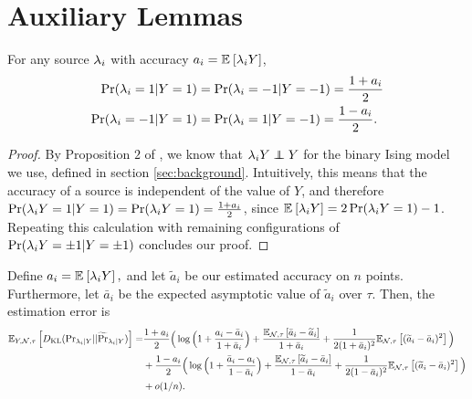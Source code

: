 \section{Auxiliary Lemmas}

\begin{lemma}
For any source $\lambda_i$ with accuracy $a_i = \mathbb{E}_{}\left[\lambda_i Y\right]$,
\begin{align*}
\Pr(\lambda_i = 1 | Y = 1) &= \Pr(\lambda_i = -1 | Y = -1) = \frac{1 + a_i}{2}  \\
\Pr(\lambda_i = -1 | Y = 1) &= \Pr(\lambda_i = 1 | Y = -1) = \frac{1 - a_i}{2}.
\end{align*}
\label{lemma:fs_symmetry}
\end{lemma}
\begin{proof}
By Proposition $2$ of \cite{fu2020fast}, we know that $\lf_i Y \independent Y$ for the binary Ising model we use, defined in section \ref{sec:background}. Intuitively, this means that the accuracy of a source is independent of the value of $Y$, and therefore $\Pr(\lambda_i Y = 1 | Y = 1) = \Pr(\lambda_i Y = 1) = \frac{1 + a_i}{2}$, since $\mathbb{E}_{}\left[\lambda_i Y\right] = 2 \Pr(\lambda_i Y = 1) - 1$. Repeating this calculation with remaining configurations of $\Pr(\lambda_i Y = \pm 1 | Y = \pm 1)$ concludes our proof.
\end{proof}

\begin{lemma}
Define $a_i = \mathbb{E}_{}\left[\lambda_i Y\right],$ and let $\widetilde{a}_i$ be our estimated accuracy on $n$ points. Furthermore, let $\bar{a}_i$ be the expected asymptotic value of $\widetilde{a}_i$ over $\tau$.   %
Then, the estimation error is
\begin{align*}
\mathbb{E}_{Y, \mathcal{N}, \tau}\left[D_{\mathrm{KL}} (\mathrm{Pr}_{\lambda_i | Y} || \widetilde{\Pr}_{\lambda_i | Y} )\right] = &\frac{1 + a_i}{2} \Big(\log\Big(1 + \frac{a_i - \bar{a}_i }{1 + \bar{a}_i}\Big) + \frac{\mathbb{E}_{\mathcal{N}, \tau}\left[\bar{a}_i - \widetilde{a}_i\right]}{1 + \bar{a}_i} + \frac{1}{2(1 + \bar{a}_i)^2} \mathbb{E}_{\mathcal{N}, \tau}\left[(\widetilde{a}_i - \bar{a}_i)^2\right]\Big) \\
&+  \frac{1 - a_i}{2}\Big(\log\Big(1 + \frac{\bar{a}_i - a_i}{1 - \bar{a}_i} \Big) +   \frac{\mathbb{E}_{\mathcal{N}, \tau}\left[\widetilde{a}_i - \bar{a}_i\right]}{1 - \bar{a}_i} + \frac{1}{2(1 - \bar{a}_i)^2} \mathbb{E}_{\mathcal{N}, \tau}\left[(\widetilde{a}_i - \bar{a}_i)^2\right]\Big) \\
&+ o(1/n).
\end{align*}
\label{lemma:KL_estimation}
\end{lemma}


